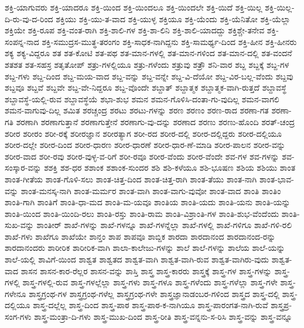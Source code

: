 {ಶಕ್ತಿ-ಯಾಗುವರು
ಶಕ್ತಿ-ಯಾದರೂ
ಶಕ್ತಿ-ಯಿಂದ
ಶಕ್ತಿ-ಯಿಂದಲೂ
ಶಕ್ತಿ-ಯಿಂದಲೇ
ಶಕ್ತಿ-ಯಿದೆ
ಶಕ್ತಿ-ಯಿಲ್ಲ
ಶಕ್ತಿ-ಯಿಲ್ಲ-ದಿ-ರು-ವು-ದ-ರಿಂದ
ಶಕ್ತಿಯು
ಶಕ್ತಿ-ಯು-ತ-ವಾದ
ಶಕ್ತಿ-ಯುಳ್ಳ
ಶಕ್ತಿಯೂ
ಶಕ್ತಿ-ಯೆಂದು
ಶಕ್ತಿ-ಯೆನಿತೋ
ಶಕ್ತಿ-ಯೆಲ್ಲಾ
ಶಕ್ತಿಯೇ
ಶಕ್ತಿ-ರೂಪ
ಶಕ್ತಿ-ವಂತ-ರಾಗಿ
ಶಕ್ತಿ-ಶಾಲಿ-ಗಳ
ಶಕ್ತಿ-ಶಾ-ಲಿನಿ
ಶಕ್ತಿ-ಶಾಲಿ-ಯಾದದ್ದು
ಶಕ್ತಿಶ್ಚೇ-ತನೇವ
ಶಕ್ತಿ-ಸಂಪನ್ನ-ನಾದ
ಶಕ್ತಿ-ಸಮುದ್ರಸ-ಮುತ್ಥ-ತರಂಗಂ
ಶಕ್ತಿ-ಸಾಧಕ-ನಾಗಿದ್ದನು
ಶಕ್ತಿ-ಸಾಮರ್ಥ್ಯ-ದಿಂದ
ಶಕ್ತಿ-ಹೀನ
ಶಕ್ತಿ-ಹೀನರು
ಶಕ್ಯ
ಶಕ್ಯ-ವಿದ್ದರೂ
ಶತ
ಶತ-ಕೋಟಿ
ಶತ-ಪಥ
ಶತ-ಮಾನ-ಗಳಲ್ಲಿ
ಶತ-ಮಾನ-ಗಳಿಂದ
ಶತ-ಮಾನ-ದಲ್ಲಿ
ಶತ-ವಂದನೆ
ಶತಶತ
ಶತ-ಸಹಸ್ರ
ಶತೃತೋಪ್
ಶತ್ರು-ಗಳಲ್ಲಿಯೂ
ಶತ್ರು-ಗಳೆಂದು
ಶತ್ರುವು
ಶತ್ರೌ
ಶನಿ-ವಾರ
ಶಬ್ದ
ಶಬ್ದಕ್ಕೆ
ಶಬ್ದ-ಗಳ
ಶಬ್ದ-ಗಳು
ಶಬ್ದ-ದಿಂದ
ಶಬ್ದ-ಮಯ-ವಾದ
ಶಬ್ದ-ವನ್ನು
ಶಬ್ದ-ವನ್ನೇ
ಶಬ್ದ-ವಿ-ದೆಯೋ
ಶಬ್ದ-ವಿರ-ಬಲ್ಲ-ವೆಂದು
ಶಬ್ದವು
ಶಬ್ದವೂ
ಶಬ್ದವೆ
ಶಬ್ದವೇ
ಶಬ್ದ-ವೇ-ನಿದ್ದರೂ
ಶಬ್ದ-ವೊಂದೇ
ಶಬ್ದಾತ್
ಶಬ್ದಾತ್ಮಕ
ಶಬ್ದಾತ್ಮಕ-ವಾಗಿ-ರುತ್ತದೆ
ಶಬ್ದಾವಸ್ಥೆ
ಶಬ್ದಾವಸ್ಥೆ-ಯಲ್ಲಿ-ರುವ
ಶಬ್ದಾವಸ್ಥೆಯೆ
ಶಭಾ-ಶುಭ
ಶಮನ
ಶಮನ-ಗೊಳಿಸಿ-ದಂತಾ-ಗು-ವುದಿಲ್ಲ
ಶಮನ-ವಾಗಲಿ
ಶಮನ-ವಾಗುವು-ದಿಲ್ಲ
ಶಮಿತ
ಶರಚ್ಚಂದ್ರ
ಶರಟು
ಶರಟು-ಗಳನ್ನು
ಶರಣ
ಶರಣಂ
ಶರಣ-ರಾದ
ಶರಣಾ-ಗತ
ಶರಣಾ-ಗತಿ
ಶರಣಾಗಿ
ಶರಣಾಗುತ್ತಾನೆ
ಶರಣಾಗುತ್ತೇನೆ
ಶರಣಾಗು-ವು-ದನ್ನು
ಶರಣಾದ
ಶರಣು
ಶರಣು-ಹೊಂದಿ
ಶರತ್-ಚಂದ್ರ
ಶರೀರ
ಶರೀರಂ
ಶರೀ-ರಕ್ಕೆ
ಶರೀರಜ್ಞಾನ
ಶರೀರತ್ಯಾಗ
ಶರೀ-ರದ
ಶರೀರ-ದಲ್ಲಿ
ಶರೀರ-ದಲ್ಲಿದ್ದರು
ಶರೀರ-ದಲ್ಲಿಯೂ
ಶರೀರ-ದಲ್ಲೇ
ಶರೀರ-ದಿಂದ
ಶರೀರ-ಧಾರಣ
ಶರೀರ-ಧಾರಣೆ
ಶರೀರ-ಧಾರ-ಣೆ-ಮಾಡಿ
ಶರೀರ-ಪಾಲನ
ಶರೀರ-ವನ್ನು
ಶರೀರ-ವಾದ
ಶರೀ-ರವು
ಶರೀರ-ವುಳ್ಳ-ವ-ರಿಗೆ
ಶರೀ-ರವೂ
ಶರೀರ-ವೆಂದು
ಶರೀರ-ವೆಂದೇ
ಶವ-ಗಳ
ಶವ-ಗಳನ್ನು
ಶವ-ಸಂಸ್ಕಾರ-ವನ್ನು
ಶಶಕ್ತಿ
ಶಶ-ಧರ
ಶಶಾಂಕ
ಶಶಾಂಕ-ಸುಂದರ
ಶಶಿ
ಶಶಿ-ಕಳೆಯೂ
ಶಶಿ-ಭೂಷಣ
ಶಶಿಯ
ಶಶಿಯು
ಶಾಂತ
ಶಾಂತ-ಗೀತೆಯ
ಶಾಂತ-ಗೊಳಿ-ಸಲು
ಶಾಂತ-ಚಿತ್ತ-ದಿಂದ
ಶಾಂತ-ಚಿತ್ತ-ರಾಗಿ
ಶಾಂತ-ತೆಯು
ಶಾಂತ-ನಾಗಿ
ಶಾಂತ-ಭಾವ-ವನ್ನು
ಶಾಂತ-ಮನಸ್ಕ-ನಾಗಿ
ಶಾಂತ-ಮರ್ಮರ
ಶಾಂತ-ವಾಗಿ
ಶಾಂತ-ವಾಗು-ವುವೋ
ಶಾಂತ-ವಾದ
ಶಾಂತಿ
ಶಾಂತಿಂ
ಶಾಂತಿ-ಗಾಗಿ
ಶಾಂತಿಗೆ
ಶಾಂತಿ-ಧಾ-ಮದ
ಶಾಂತಿ-ಮ-ಯವೂ
ಶಾಂತಿಯ
ಶಾಂತಿ-ಯದು
ಶಾಂತಿ-ಯನು
ಶಾಂತಿ-ಯನ್ನು
ಶಾಂತಿ-ಯಿಂದ
ಶಾಂತಿ-ಯಿಂದಿ-ರಲು
ಶಾಂತಿ-ರಸ್ತು
ಶಾಂತಿ-ರಾಮ
ಶಾಂತಿ-ವಿಶ್ರಾಂತಿ-ಗಳ
ಶಾಂತಿ-ಶುಭ-ವೆಂದೆಂದು
ಶಾಂತಿ-ಸುಖ-ವನ್ನು
ಶಾಂತೀರ್
ಶಾಖೆ-ಗಳನ್ನು
ಶಾಖೆ-ಗಳನ್ನೂ
ಶಾಖೆ-ಗಳನ್ನೆಲ್ಲಾ
ಶಾಖೆ-ಗಳಲ್ಲಿ
ಶಾಖೆ-ಗಳಿಗೂ
ಶಾಖೆ-ಗಳಿ-ರಲಿ
ಶಾಖೆ-ಗಳು
ಶಾಖೆಗೂ
ಶಾಖೆಯೇ
ಶಾನ್ತಂ
ಶಾಪ
ಶಾಪವೂ
ಶಾಬ್ದಿಕ
ಶಾರದಾ
ಶಾರದಾನಂದ
ಶಾರದಾನಂದ-ರನ್ನು
ಶಾರದಾನಂದರು
ಶಾರೀರಿಕ
ಶಾರೀರಿಕ-ವಾಗಿ
ಶಾಲಾ-ಕಾಲೇಜು-ಗಳನ್ನು
ಶಾಲೆ
ಶಾಲೆ-ಗಳನ್ನು
ಶಾಲೆಯ
ಶಾಲೆ-ಯನ್ನು
ಶಾಲೆ-ಯಲ್ಲಿ
ಶಾವಿಗೆ-ಯಿಂದ
ಶಾಶ್ವತ
ಶಾಶ್ವತದ
ಶಾಶ್ವತ-ವಾಗಿ
ಶಾಶ್ವತ-ವಾಗಿ-ರುವ
ಶಾಶ್ವತ-ವಾಗಿರು-ವುದು
ಶಾಶ್ವತ-ವಾದ
ಶಾಸನ
ಶಾಸನ-ಕಾರ-ರೆಲ್ಲರ
ಶಾಸನ-ವನ್ನು
ಶಾಸ್ತಿ
ಶಾಸ್ತ್ರ
ಶಾಸ್ತ್ರ-ಕಾರರು
ಶಾಸ್ತ್ರಕ್ಕೆ
ಶಾಸ್ತ್ರ-ಗಳ
ಶಾಸ್ತ್ರ-ಗಳನ್ನು
ಶಾಸ್ತ್ರ-ಗಳಲ್ಲಿ
ಶಾಸ್ತ್ರ-ಗಳಲ್ಲಿ-ರುವ
ಶಾಸ್ತ್ರ-ಗಳಲ್ಲೆಲ್ಲಾ
ಶಾಸ್ತ್ರ-ಗಳು
ಶಾಸ್ತ್ರ-ಗಳೂ
ಶಾಸ್ತ್ರ-ಗಳೆಂದು
ಶಾಸ್ತ್ರ-ಗಳೆಲ್ಲಾ
ಶಾಸ್ತ್ರ-ಗಳೇ
ಶಾಸ್ತ್ರ-ಗಳೇನೂ
ಶಾಸ್ತ್ರಗ್ರಂಥ-ಗಳ
ಶಾಸ್ತ್ರಗ್ರಂಥ-ಗಳೆಲ್ಲ
ಶಾಸ್ತ್ರಗ್ರಂಥ-ಗಳೇ
ಶಾಸ್ತ್ರಜ್ಞಾನಾಡಂಬರ-ಗಳಿಂದ
ಶಾಸ್ತ್ರದ
ಶಾಸ್ತ್ರ-ದಲ್ಲಿ
ಶಾಸ್ತ್ರ-ದಲ್ಲಿಯೂ
ಶಾಸ್ತ್ರ-ದಲ್ಲೆಲ್ಲ
ಶಾಸ್ತ್ರ-ದಿಂದ
ಶಾಸ್ತ್ರ-ಪಾಠ
ಶಾಸ್ತ್ರ-ಪಾಠ-ಕ-ನಾಗಿಯೂ
ಶಾಸ್ತ್ರ-ಪಾರಂಗತ-ನಾಗಿ-ರುವೆ
ಶಾಸ್ತ್ರಪ್ರ-ಸಂಗ-ಗಳು
ಶಾಸ್ತ್ರ-ಮಂತ್ರಾ-ದಿ-ಗಳು
ಶಾಸ್ತ್ರ-ಮುಖ-ದಿಂದ
ಶಾಸ್ತ್ರ-ರೀತಿ
ಶಾಸ್ತ್ರ-ವನ್ನನು-ಸ-ರಿಸಿ
ಶಾಸ್ತ್ರ-ವನ್ನು
ಶಾಸ್ತ್ರ-ವನ್ನೂ
}
